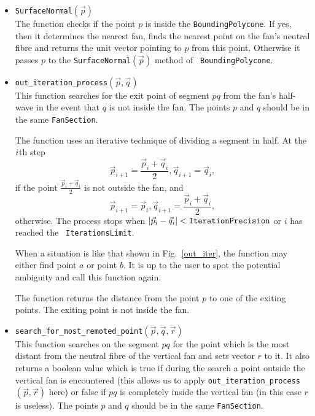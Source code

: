 \documentclass{article}
\begin{document}
\begin{itemize}
\item {\tt SurfaceNormal$(\vec{p})$}\\
The function checks if the point $p$ is inside the {\tt BoundingPolycone}. If
yes, then it determines the nearest fan, finds the nearest point on the fan's
neutral fibre and returns the unit vector pointing to $p$ from this point.
Otherwise it 
passes $p$ to the {\tt SurfaceNormal$(\vec{p})$} method of {\tt
BoundingPolycone}.

\item {\tt out\_iteration\_process$(\vec{p}, \vec{q})$}\\
This function searches for the exit point of segment $pq$ from the fan's
half-wave in the event that $q$ is not inside the fan. The points $p$ and $q$
should be in the same {\tt FanSection}.

The function uses an iterative technique of dividing a segment in half.
At the $i\/$th step 
\[\vec{p}_{i+1} = \frac{\vec{p}_i+\vec{q}_i}{2}, \vec{q}_{i+1} = \vec{q}_i,\]
if the point $\frac{\vec{p}_i+\vec{q}_i}{2}$ is not outside the fan, and
\[\vec{p}_{i+1} = \vec{p}_i,  \vec{q}_{i+1} = \frac{\vec{p}_i+\vec{q}_i}{2},\]
otherwise. The process stops when
$|\vec{p}_i-\vec{q}_i|<{\tt IterationPrecision\/}\/$ or $i$ has reached the {\tt
IterationsLimit}.


When a situation is like that shown in Fig.~\ref{out_iter}, 
the function may either find point $a$ or point $b$. It is up to the user to
spot the potential ambiguity and call this function again.

The function returns the distance from the point $p$ to one of the exiting
points. The exiting point is not inside the fan.
 
\item {\tt search\_for\_most\_remoted\_point$(\vec{p}, \vec{q}, \vec{r})$}\\
This function searches on the segment $pq$ for the point which is the
most distant from the neutral fibre of the vertical fan and sets
vector $r$ to it. It also returns a boolean value which is true if
during the search a point outside the vertical fan is encountered
(this allows us to apply {\tt out\_iteration\_process$(\vec{p},
\vec{r})$} here) or false if $pq$ is completely inside the vertical
fan (in this case $r$ is useless). The points $p$ and $q$ should be in
the same {\tt FanSection}.


\end{itemize}
\end{document}
